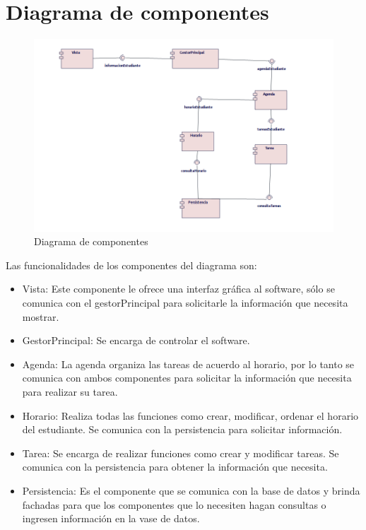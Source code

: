 \section{Diagrama de componentes}
\begin{figure}[H]
	\centering
	\includegraphics[width=1\linewidth]{diseno/componentes/img/diagramaComponentes}
	\caption{Diagrama de componentes}
	\label{fig:componentes}
\end{figure}
Las funcionalidades de los componentes del diagrama son:
\begin{itemize}
	\item Vista: Este componente le ofrece una interfaz gráfica al software, sólo se comunica con el gestorPrincipal para solicitarle la información que necesita mostrar.
	\item GestorPrincipal: Se encarga de controlar el software.
	\item Agenda: La agenda organiza las tareas de acuerdo al horario, por lo tanto se comunica con ambos componentes para solicitar la información que necesita para realizar su tarea.
	\item Horario: Realiza todas las funciones como crear, modificar, ordenar el horario del estudiante. Se comunica con la persistencia para solicitar información.
	\item Tarea: Se encarga de realizar funciones como crear y  modificar tareas. Se comunica con la persistencia para obtener la información que necesita.
	\item Persistencia: Es el componente que se comunica con la base de datos y brinda fachadas para que los componentes que lo necesiten hagan consultas o ingresen información en la vase de datos.
\end{itemize}
	

